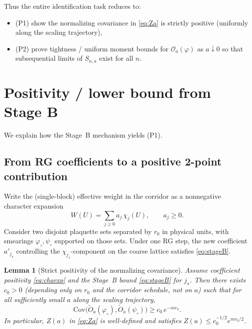 \documentclass[11pt]{article}
\newtheorem{lemma}[theorem]{Lemma}
\theoremstyle{definition}
\newcommand{\Cov}{\mathrm{Cov}}
\newcommand{\1}{\mathbf{1}}
\begin{document}
Thus the entire identification task reduces to:
\begin{itemize}
\item (P1) show the normalizing covariance in \eqref{eq:Za} is strictly positive (uniformly along the scaling trajectory),
\item (P2) prove tightness / uniform moment bounds for $\mathcal O_a(\varphi)$ as $a\downarrow 0$ so that subsequential limits of $S_{n,a}$ exist for all $n$.
\end{itemize}

\section{Positivity / lower bound from Stage B}
We explain how the Stage~B mechanism yields (P1).

\subsection{From RG coefficients to a positive 2-point contribution}
Write the (single-block) effective weight in the corridor as a nonnegative character expansion
\begin{equation}\label{eq:charxp}
W(U)=\sum_{j\ge 0} a_j\,\chi_j(U),\qquad a_j\ge 0.
\end{equation}
Consider two disjoint plaquette sets separated by $r_0$ in physical units, with smearings $\varphi_\circ,\psi_\circ$ supported on those sets.
Under one RG step, the new coefficient $a'_{j_\star}$ controlling the $\chi_{j_\star}$-component on the coarse lattice satisfies \eqref{eq:stageB}.

\begin{lemma}[Strict positivity of the normalizing covariance]\label{lem:covpos}
Assume coefficient positivity \eqref{eq:charxp} and the Stage~B bound \eqref{eq:stageB} for $j_\star$.
Then there exists $c_0>0$ (depending only on $r_0$ and the corridor schedule, not on $a$) such that for all sufficiently small $a$ along the scaling trajectory,
\begin{equation}\label{eq:covlower}
\Cov\big(\widetilde O_a(\varphi_\circ),\widetilde O_a(\psi_\circ)\big)\ge c_0\,e^{-m r_0}.
\end{equation}
In particular, $Z(a)$ in \eqref{eq:Za} is well-defined and satisfies $Z(a)\le c_0^{-1/2}e^{m r_0/2}$.
\end{lemma}
\end{document}
